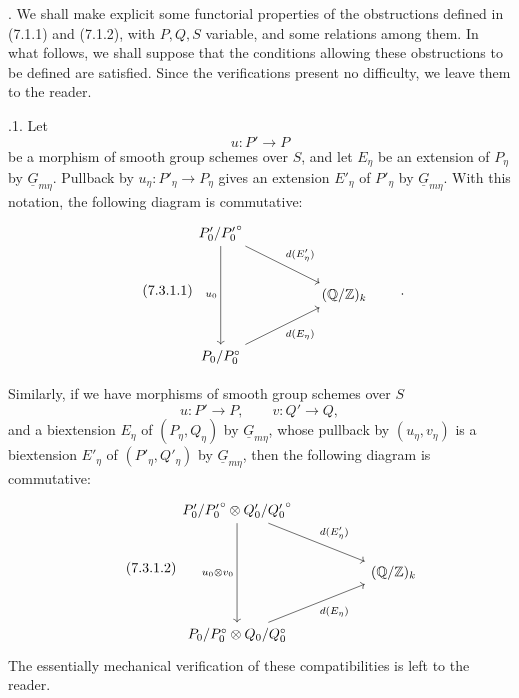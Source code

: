 
\medskip
{}.  We shall make explicit some functorial properties of the
obstructions defined in (7.1.1) and (7.1.2), with $P,Q,S$ variable, and
some relations among them.  In what follows, we shall suppose that the
conditions allowing these obstructions to be defined are satisfied.  Since
the verifications present no difficulty, we leave them to the reader.

\medskip
{}.1.  Let
\[
 u:P'\longrightarrow P
\]
be a morphism of smooth group schemes over $S$, and let $E_\eta$ be an
extension of $P_\eta$ by $\underline G_{m\eta}$.  Pullback by
$u_\eta:P'_\eta\to P_\eta$ gives an extension $E'_\eta$ of $P'_\eta$ by
$\underline G_{m\eta}$.  With this notation, the following diagram is
commutative:
\begin{equation}\tag{7.3.1.1}
\begin{tikzcd}[row sep=large,column sep=huge]
 P'_0/{P'_0}^{\circ}
   \arrow[dd,"u_0"']
   \arrow[rd,"d(E'_\eta)"] & \\
 & (\mathbb Q/\mathbb Z)_k \\
 P_0/P_0^{\circ}
   \arrow[ru,"d(E_\eta)"'] &
\end{tikzcd}
\qquad .
\end{equation}

Similarly, if we have morphisms of smooth group schemes over $S$
\[
 u:P'\longrightarrow P,\qquad v:Q'\longrightarrow Q,
\]
and a biextension $E_\eta$ of $(P_\eta,Q_\eta)$ by
$\underline G_{m\eta}$, whose pullback by $(u_\eta,v_\eta)$ is a
biextension $E'_\eta$ of $(P'_\eta,Q'_\eta)$ by
$\underline G_{m\eta}$, then the following diagram is commutative:
\begin{equation}\tag{7.3.1.2}
\begin{tikzcd}[row sep=large,column sep=huge]
 P'_0/{P'_0}^{\circ}\otimes Q'_0/{Q'_0}^{\circ}
   \arrow[dd,"u_0\otimes v_0"']
   \arrow[rd,"d(E'_\eta)"] & \\
 & (\mathbb Q/\mathbb Z)_k \\
 P_0/P_0^{\circ}\otimes Q_0/Q_0^{\circ}
   \arrow[ru,"d(E_\eta)"'] &
\end{tikzcd}
\end{equation}
The essentially mechanical verification of these compatibilities is left
to the reader.
